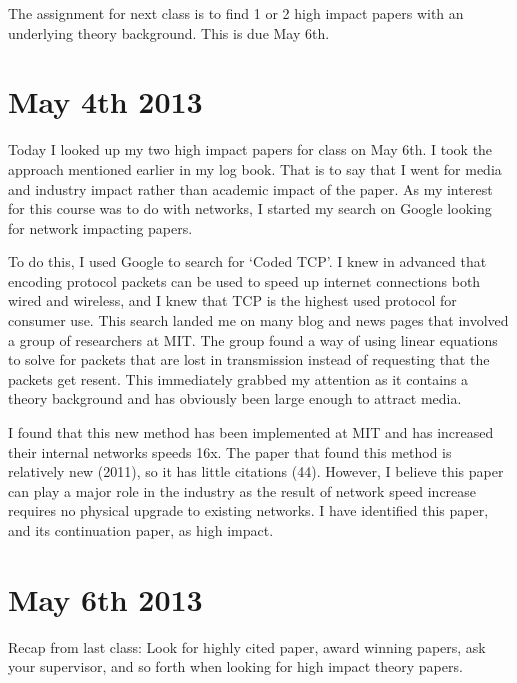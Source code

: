 \documentclass[conference]{IEEEtran}
\begin{document}
The assignment for next class is to find 1 or 2 high impact papers with an underlying theory
background. This is due May 6th.


\section{May 4th 2013}
Today I looked up my two high impact papers for class on May 6th. I took the approach
mentioned earlier in my log book. That is to say that I went for media and industry
impact rather than academic impact of the paper. As my interest for this course was
to do with networks, I started my search on Google looking for network impacting papers.

To do this, I used Google to search for `Coded TCP'. I knew in advanced that encoding
protocol packets can be used to speed up internet connections both wired and wireless,
and I knew that TCP is the highest used protocol for consumer use. This search landed me
on many blog and news pages that involved a group of researchers at MIT. The group found
a way of using linear equations to solve for packets that are lost in transmission instead
of requesting that the packets get resent. This immediately grabbed my attention as it
contains a theory background and has obviously been large enough to attract media.

I found that this new method has been implemented at MIT and has increased their internal
networks speeds 16x. The paper that found this method is relatively new (2011), so it has
little citations (44). However, I believe this paper can play a major role in the industry
as the result of network speed increase requires no physical upgrade to existing networks.
I have identified this paper, and its continuation paper, as high impact.


\section{May 6th 2013}

Recap from last class: Look for highly cited paper, award winning papers, ask your supervisor, 
and so forth when looking for high impact theory papers.
\end{document}

